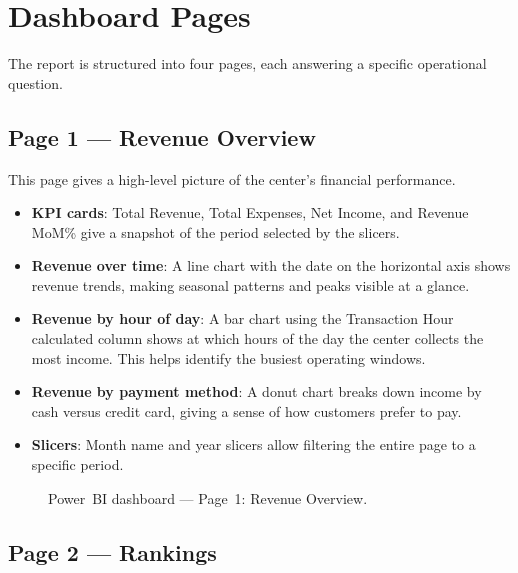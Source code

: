 \section{Dashboard Pages}

The report is structured into four pages, each answering a specific operational
question.

\subsection{Page 1 — Revenue Overview}

This page gives a high-level picture of the center's financial performance.

\begin{itemize}
  \item \textbf{KPI cards}: Total Revenue, Total Expenses, Net Income, and
        Revenue MoM\% give a snapshot of the period selected by the slicers.
  \item \textbf{Revenue over time}: A line chart with the date on the horizontal
        axis shows revenue trends, making seasonal patterns and peaks visible
        at a glance.
  \item \textbf{Revenue by hour of day}: A bar chart using the Transaction Hour
        calculated column shows at which hours of the day the center collects the
        most income. This helps identify the busiest operating windows.
  \item \textbf{Revenue by payment method}: A donut chart breaks down income by
        cash versus credit card, giving a sense of how customers prefer to pay.
  \item \textbf{Slicers}: Month name and year slicers allow filtering the entire
        page to a specific period.
\end{itemize}

\begin{figure}[H]
  \centering
  \caption{Power~BI dashboard --- Page~1: Revenue Overview.}
  \label{fig:pbi_page1}
\end{figure}

\subsection{Page 2 — Rankings}

